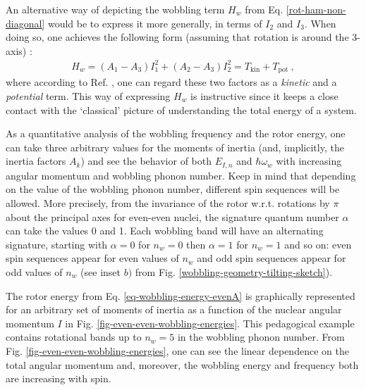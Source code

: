 An alternative way of depicting the wobbling term $H_w$ from Eq. \ref{rot-ham-non-diagonal} would be to express it more generally, in terms of $I_2$ and $I_3$. When doing so, one achieves the following form (assuming that rotation is around the $3$-axis) \cite{oi2006semi}:
\begin{align}
    H_w=(A_1-A_3)I_1^2+(A_2-A_3)I_2^2=T_\text{kin}+T_\text{pot}\ ,
\end{align}
where according to Ref. \cite{wen2015wobbling}, one can regard these two factors as a \emph{kinetic} and a \emph{potential} term. This way of expressing $H_w$ is instructive since it keeps a close contact with the `classical' picture of understanding the total energy of a system.

As a quantitative analysis of the wobbling frequency and the rotor energy, one can take three arbitrary values for the moments of inertia (and, implicitly, the inertia factors $A_k$) and see the behavior of both $E_{I,n}$ and $\hbar\omega_w$ with increasing angular momentum and wobbling phonon number. Keep in mind that depending on the value of the wobbling phonon number, different spin sequences will be allowed. More precisely, from the invariance of the rotor w.r.t. rotations by $\pi$ about the principal axes for even-even nuclei, the signature quantum number $\alpha$ can take the values 0 and 1. Each wobbling band will have an alternating signature, starting with $\alpha=0$ for $n_w=0$ then $\alpha=1$ for $n_w=1$ and so on: even spin sequences appear for even values of $n_w$ and odd spin sequences appear for odd values of $n_w$ (see inset $b)$ from Fig. \ref{wobbling-geometry-tilting-sketch}).

The rotor energy from Eq. \ref{eq-wobbling-energy-evenA} is graphically represented for an arbitrary set of moments of inertia as a function of the nuclear angular momentum $I$ in Fig. \ref{fig-even-even-wobbling-energies}. This pedagogical example contains rotational bands up to $n_w=5$ in the wobbling phonon number. From Fig. \ref{fig-even-even-wobbling-energies}, one can see the linear dependence on the total angular momentum and, moreover, the wobbling energy and frequency both are increasing with spin.

